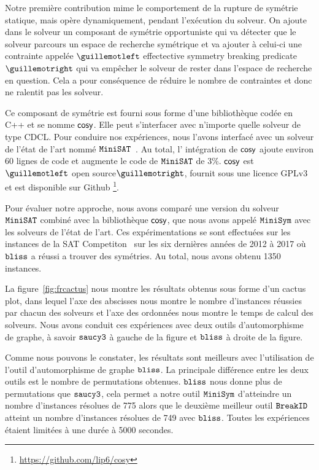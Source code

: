 Notre première contribution mime le comportement de la rupture de symétrie statique, mais 
opère dynamiquement, pendant l'exécution du solveur. On ajoute dans le solveur un composant de symétrie opportuniste qui va détecter que le solveur parcours un espace de recherche symétrique et va ajouter à celui-ci une contrainte appelée $\guillemotleft$ effectective symmetry breaking predicate $\guillemotright$ qui va empêcher le solveur de rester dans
l'espace de recherche en question. Cela a pour conséquence de réduire le nombre de contraintes et donc 
ne ralentit pas les solveur.


Ce composant de symétrie est fourni sous forme d'une bibliothèque codée en C++ et se nomme $\textsf{cosy}$.
Elle peut s'interfacer avec n'importe quelle solveur de type CDCL. 
Pour conduire nos expériences, nous l'avons interfacé avec un solveur de l'état de l'art nommé $\texttt{MiniSAT}$~\cite{een2003extensible}. Au total, l' intégration de $\textsf{cosy}$ ajoute environ 60 lignes de code 
et augmente le code de $\texttt{MiniSAT}$ de 3\%.
$\textsf{cosy}$ est $\guillemotleft$ open source$\guillemotright$, fournit sous une licence GPLv3 et est disponible sur Github \footnote{\url{https://github.com/lip6/cosy}}.


Pour évaluer notre approche, nous avons comparé une version du solveur $\texttt{MiniSAT}$ combiné avec la bibliothèque $\textsf{cosy}$, que nous avons appelé $\texttt{MiniSym}$ avec les solveurs de l'état de l'art.
Ces expérimentations se sont effectuées sur les instances de la SAT Competiton~\cite{jarvisalo2012international} sur les six dernières années de 2012 à 2017 où $\texttt{bliss}$ a réussi a trouver des symétries. Au total, nous avons obtenu 1350 instances.

La figure~\ref{fig:frcactus} nous montre les résultats obtenus sous forme d'un cactus plot, 
dans lequel l'axe des abscisses nous montre le nombre d'instances réussies par chacun des solveurs et l'axe des ordonnées nous montre le temps de calcul des solveurs.
Nous avons conduit ces expériences avec deux outils d'automorphisme de graphe, à savoir 
$\texttt{saucy3}$ à gauche de la figure et $\texttt{bliss}$ à droite de la figure. 

Comme nous pouvons le constater, les résultats sont meilleurs  avec l'utilisation de l'outil d'automorphisme de 
graphe $\texttt{bliss}$. La principale différence entre les deux outils est le nombre de permutations obtenues.
$\texttt{bliss}$ nous donne plus de permutations que $\texttt{saucy3}$, cela permet a notre outil $\texttt{MiniSym}$ d'atteindre 
un nombre d'instances résolues de 775 alors que le deuxième meilleur outil $\texttt{BreakID}$ atteint un nombre d'instances résolues de 749 avec $\texttt{bliss}$. Toutes les expériences étaient limitées à une durée à 5000 secondes.

